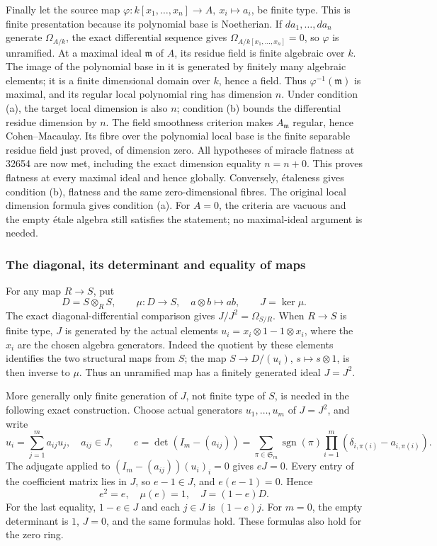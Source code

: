 Finally let the source map \(\varphi:k[x_1,\ldots,x_n]\to A,\ x_i\mapsto a_i\), be finite type. This is finite presentation because its polynomial base is Noetherian. If \(da_1,\ldots,da_n\) generate \(\Omega_{A/k}\), the exact differential sequence gives \(\Omega_{A/k[x_1,\ldots,x_n]}=0\), so \(\varphi\) is unramified. At a maximal ideal \(\mathfrak m\) of \(A\), its residue field is finite algebraic over \(k\). The image of the polynomial base in it is generated by finitely many algebraic elements; it is a finite dimensional domain over \(k\), hence a field. Thus \(\varphi^{-1}(\mathfrak m)\) is maximal, and its regular local polynomial ring has dimension \(n\). Under condition (a), the target local dimension is also \(n\); condition (b) bounds the differential residue dimension by \(n\). The field smoothness criterion makes \(A_{\mathfrak m}\) regular, hence Cohen--Macaulay. Its fibre over the polynomial local base is the finite separable residue field just proved, of dimension zero. All hypotheses of miracle flatness at 32654 are now met, including the exact dimension equality \(n=n+0\). This proves flatness at every maximal ideal and hence globally. Conversely, étaleness gives condition (b), flatness and the same zero-dimensional fibres. The original local dimension formula gives condition (a). For \(A=0\), the criteria are vacuous and the empty étale algebra still satisfies the statement; no maximal-ideal argument is needed.

\subsubsection{The diagonal, its determinant and equality of maps}\label{algebra-proof-056-the-diagonal-its-determinant-and-equality-of-maps}

For any map \(R\to S\), put \[
D=S\otimes_RS,\qquad \mu:D\to S,\quad a\otimes b\mapsto ab,\qquad
J=\ker\mu.
\] The exact diagonal-differential comparison gives \(J/J^2=\Omega_{S/R}\). When \(R\to S\) is finite type, \(J\) is generated by the actual elements \(u_i=x_i\otimes1-1\otimes x_i\), where the \(x_i\) are the chosen algebra generators. Indeed the quotient by these elements identifies the two structural maps from \(S\); the map \(S\to D/(u_i)\), \(s\mapsto s\otimes1\), is then inverse to \(\mu\). Thus an unramified map has a finitely generated ideal \(J=J^2\).

More generally only finite generation of \(J\), not finite type of \(S\), is needed in the following exact construction. Choose actual generators \(u_1,\ldots,u_m\) of \(J=J^2\), and write \[
u_i=\sum_{j=1}^m a_{ij}u_j,\quad a_{ij}\in J,\qquad
e=\det(I_m-(a_{ij}))
=\sum_{\pi\in\mathfrak S_m}\operatorname{sgn}(\pi)
\prod_{i=1}^m(\delta_{i,\pi(i)}-a_{i,\pi(i)}).
\tag{UR-1}
\] The adjugate applied to \((I_m-(a_{ij}))(u_i)_i=0\) gives \(eJ=0\). Every entry of the coefficient matrix lies in \(J\), so \(e-1\in J\), and \(e(e-1)=0\). Hence \[
e^2=e,\quad \mu(e)=1,\quad J=(1-e)D.
\tag{UR-2}
\] For the last equality, \(1-e\in J\) and each \(j\in J\) is \((1-e)j\). For \(m=0\), the empty determinant is \(1\), \(J=0\), and the same formulas hold. These formulas also hold for the zero ring.

